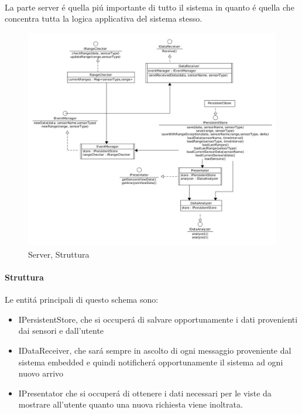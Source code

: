 \paragraph{}La parte server \'e quella pi\'u importante di tutto il sistema in quanto \'e quella che concentra tutta la logica applicativa del sistema stesso.

\begin{figure}[ph]
\centering
\includegraphics[width=\textwidth,height=\textheight,keepaspectratio]{Figures/DomainModel/Server/Structure}
\caption{Server, Struttura}
\end{figure}

\afterpage{\clearpage}

\newpage

\paragraph{Struttura}

Le entit\'a principali di questo schema sono:
\begin{itemize}
  \item IPersistentStore, che si occuper\'a di salvare opportunamente i dati provenienti dai sensori e dall'utente
  \item IDataReceiver, che sar\'a sempre in ascolto di ogni messaggio proveniente dal sistema embedded e quindi notificher\'a opportunamente il sistema ad ogni nuovo arrivo
  \item IPresentator che si occuper\'a di ottenere i dati necessari per le viste da mostrare all'utente quanto una nuova richiesta viene inoltrata.
\end{itemize}

